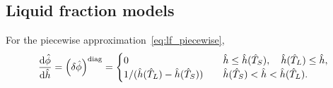 \documentclass{article}
\newcommand{\diag}[1]{\qty(#1)^\mathrm{diag}}
\newcommand{\Hh}{\hat{h}}
\newcommand{\HT}{\hat{T}}
\newcommand{\Hphi}{\hat{\phi}}
\begin{document}
\subsection{Liquid fraction models}

For the piecewise approximation~\eqref{eq:lf_piecewise},
\begin{equation}
	\dv{\Hphi}{\Hh} = \diag{\var{\Hphi}} = \begin{cases}
        0 & \quad \Hh \leq \Hh(\HT_S), \quad \Hh(\HT_L) \leq \Hh, \\
        1/(\Hh(\HT_L)-\Hh(\HT_S)) & \quad \Hh(\HT_S) < \Hh < \Hh(\HT_L). \\
    \end{cases} \label{eq:pert_phi_h_diag}
\end{equation}
\end{document}
